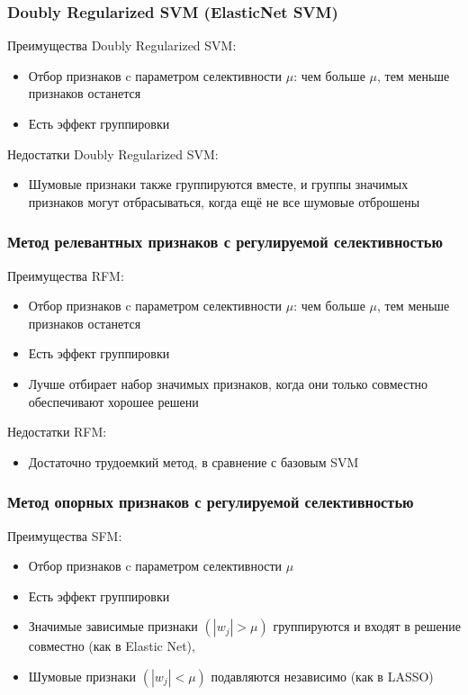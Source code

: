 \documentclass[12pt,a4paper]{article}
\begin{document}
\subsubsection{Doubly Regularized SVM (ElasticNet SVM)}
Преимущества Doubly Regularized SVM:
\begin{itemize}
	\item  Отбор признаков c параметром селективности $\mu$:
	чем больше $\mu$, тем меньше признаков останется
	\item  Есть эффект группировки
\end{itemize}

Недостатки Doubly Regularized SVM:
\begin{itemize}
	\item  Шумовые признаки также группируются вместе,
	и группы значимых признаков могут отбрасываться,
	когда ещё не все шумовые отброшены
\end{itemize}

\subsubsection{Метод релевантных признаков с регулируемой селективностью}
Преимущества RFM:
\begin{itemize}
	\item Отбор признаков c параметром селективности $\mu$:
	чем больше $\mu$, тем меньше признаков останется
	\item Есть эффект группировки
	\item Лучше отбирает набор значимых признаков, когда
	они только совместно обеспечивают хорошее решени
\end{itemize}

Недостатки RFM:
\begin{itemize}
	\item Достаточно трудоемкий метод, в сравнение с базовым SVM
\end{itemize}

\subsubsection{Метод опорных признаков с регулируемой селективностью}
Преимущества SFM:
\begin{itemize}
	\item Отбор признаков c параметром селективности $\mu$
	\item Есть эффект группировки
	\item Значимые зависимые признаки $(|w_j| > \mu)$ группируются и входят в решение совместно (как в Elastic Net),
	\item Шумовые признаки $(|w_j| < \mu)$ подавляются независимо
	(как в LASSO)
\end{itemize}
\end{document}
